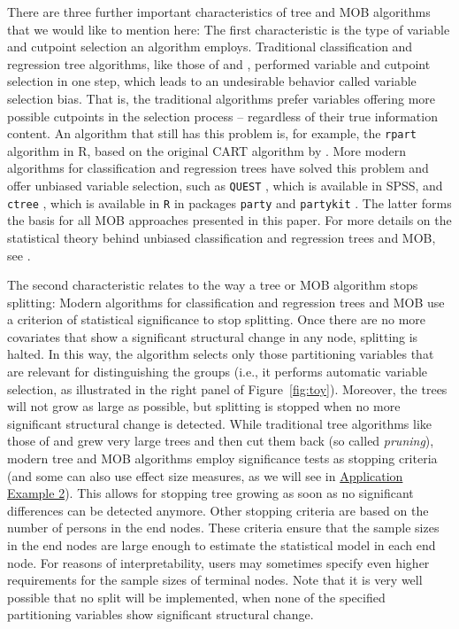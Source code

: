 \documentclass[doc,floatsintext,natbib]{apa7}
\begin{document}
There are three further important characteristics of tree and MOB algorithms that we would like to mention here: The first characteristic is the type of variable and cutpoint selection an algorithm employs. Traditional classification and regression tree algorithms, like those of \citet{Breetal:1984} and \citet{Qui:1993}, performed variable and cutpoint selection in one step, which leads to an undesirable behavior called variable selection bias. That is, the traditional algorithms prefer variables offering more possible cutpoints in the selection process -- regardless of their true information content. An algorithm that still has this problem is, for example, the \texttt{rpart} algorithm in R, based on the original CART algorithm by \citet{Breetal:1984}. More modern algorithms for classification and regression trees have solved this problem and offer unbiased variable selection, such as \texttt{QUEST} \citep{LohShi:1997}, which is available in SPSS, and \texttt{ctree} \citep{Hotetal:2006}, which is available in \texttt{R} in packages \texttt{party} and \texttt{partykit} \citep{partykit:pkg}. The latter forms the basis for all MOB approaches presented in this paper. For more details on the statistical theory behind unbiased classification and regression trees and MOB, see \citet{Hotetal:2006,StrMalTut:2009:PM,StroyKopf15}.  

The second characteristic relates to the way a tree or MOB algorithm stops splitting: Modern algorithms for classification and regression trees and MOB use a criterion of statistical significance to stop splitting. Once there are no more covariates that show a significant structural change in any node, splitting is halted. In this way, the  algorithm selects only those partitioning variables that are relevant for distinguishing the groups (i.e., it performs automatic variable selection, as illustrated in the right panel of Figure~\ref{fig:toy}). Moreover, the trees will not grow as large as possible, but splitting is stopped when no more significant structural change is detected. While traditional tree algorithms like those of \citet{Breetal:1984} and \citet{Qui:1993} grew very large trees and then cut them back (so called \textit{pruning}), modern tree and MOB algorithms employ significance tests as stopping criteria (and some can also use effect size measures, as we will see in \hyperref[sec:TutorialRasch]{Application Example 2}). This allows for stopping tree growing as soon as no significant differences can be detected anymore. Other stopping criteria are based on the number of persons in the end nodes. These criteria ensure that the sample sizes in the end nodes are large enough to estimate the statistical model in each end node. For reasons of interpretability, users may sometimes specify even higher requirements for the sample sizes of terminal nodes. Note that it is very well possible that no split will be implemented, when none of the specified partitioning variables show significant structural change. 
\end{document}
